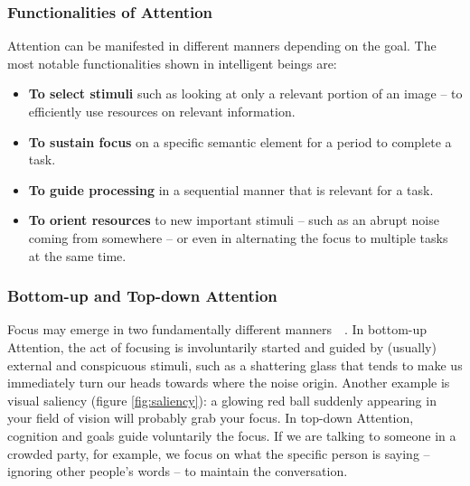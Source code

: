 \documentclass[12pt]{article}
\begin{document}
\subsubsection{Functionalities of Attention}
Attention can be manifested in different manners depending on the goal.
The most notable functionalities shown in intelligent beings are:
\begin{itemize}
    \item \textbf{To select stimuli} such as looking at only a relevant portion of an image --
        to efficiently use resources on relevant information.
    \item \textbf{To sustain focus} on a specific semantic element for a period to complete
        a task.
    \item \textbf{To guide processing} in a sequential manner that is relevant for a task.
    \item \textbf{To orient resources} to new important stimuli
        -- such as an abrupt noise coming from somewhere --
        or even in alternating the focus to multiple tasks at the same time.
\end{itemize}

\subsubsection{Bottom-up and Top-down Attention}
\label{bu-td}
Focus may emerge in two fundamentally different manners~\cite{ref:esther-thesis}~\cite{ref:vocus}.
In bottom-up Attention, the act of focusing is involuntarily
started and guided by (usually) external and conspicuous stimuli,
such as a shattering glass that tends to
make us immediately turn our heads towards where the noise origin.
Another example is visual saliency (figure \ref{fig:saliency}):
a glowing red ball suddenly appearing in
your field of vision will probably grab your focus.
In top-down Attention, cognition and goals guide voluntarily the focus.
If we are talking to someone in a crowded party, for example,
we focus on what the specific person is saying
-- ignoring other people's words -- to maintain the conversation.
\end{document}
